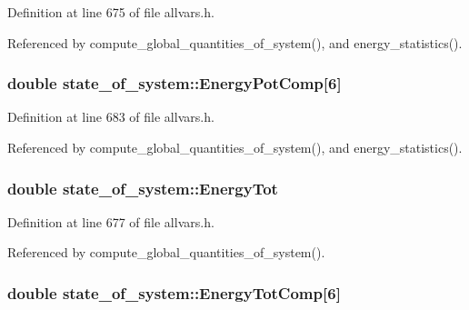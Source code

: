 Definition at line 675 of file allvars.h.



Referenced by compute\_\-global\_\-quantities\_\-of\_\-system(), and energy\_\-statistics().

\hypertarget{structstate__of__system_af495e90a93989d10e7f138c33c5cdad3}{
\subsubsection[{EnergyPotComp}]{\setlength{\rightskip}{0pt plus 5cm}double {\bf state\_\-of\_\-system::EnergyPotComp}\mbox{[}6\mbox{]}}}
\label{structstate__of__system_af495e90a93989d10e7f138c33c5cdad3}


Definition at line 683 of file allvars.h.



Referenced by compute\_\-global\_\-quantities\_\-of\_\-system(), and energy\_\-statistics().

\hypertarget{structstate__of__system_a2e6631f75e195c1b3cc446478bbdf413}{
\subsubsection[{EnergyTot}]{\setlength{\rightskip}{0pt plus 5cm}double {\bf state\_\-of\_\-system::EnergyTot}}}
\label{structstate__of__system_a2e6631f75e195c1b3cc446478bbdf413}


Definition at line 677 of file allvars.h.



Referenced by compute\_\-global\_\-quantities\_\-of\_\-system().

\hypertarget{structstate__of__system_a2e9e012733cab8c6352b8eb23dfa4763}{
\subsubsection[{EnergyTotComp}]{\setlength{\rightskip}{0pt plus 5cm}double {\bf state\_\-of\_\-system::EnergyTotComp}\mbox{[}6\mbox{]}}}
\label{structstate__of__system_a2e9e012733cab8c6352b8eb23dfa4763}


